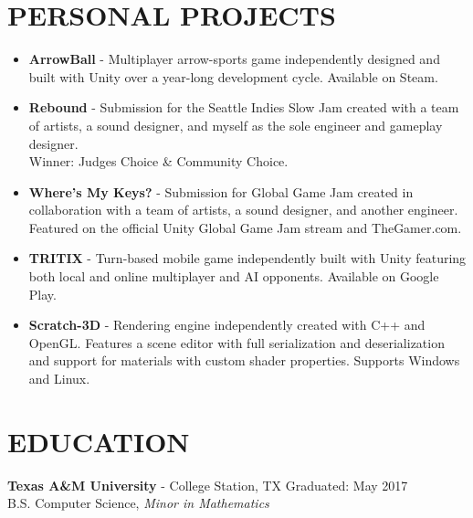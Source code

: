 \documentclass[resmargin,10pt]{res} %
\begin{document}
\begin{resume}
\section{PERSONAL PROJECTS}
				\begin{itemize}       
				\item \textbf{ArrowBall} - Multiplayer arrow-sports game independently designed and built with Unity over a year-long development cycle. Available on Steam.
				\item \textbf{Rebound} - Submission for the Seattle Indies Slow Jam created with a team of artists, a sound designer, and myself as the sole engineer and gameplay designer. \\ Winner: Judges Choice \& Community Choice.
				\item \textbf{Where's My Keys?} - Submission for Global Game Jam created in collaboration with a team of artists, a sound designer, and another engineer. Featured on the official Unity Global Game Jam stream and TheGamer.com.
                	\item \textbf{TRITIX} - Turn-based mobile game independently built with Unity featuring both local and online multiplayer and AI opponents. Available on Google Play.
                	\item \textbf{Scratch-3D} - Rendering engine independently created with C++ and OpenGL. Features a scene editor with full serialization and deserialization and support for materials with custom shader properties. Supports Windows and Linux.
                \end{itemize}
                
\section{EDUCATION}
{\bf Texas A\&M University} - College Station, TX \hfill
Graduated: May 2017 \\
B.S. Computer Science,
\textit{Minor in Mathematics}
\end{resume} 
\end{document}
